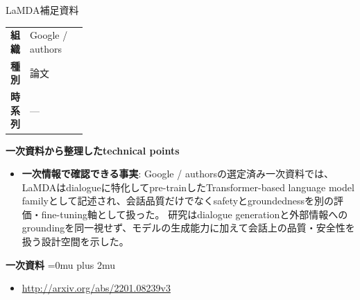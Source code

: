 \begin{technicalnote}{LaMDA}{補足資料}
\begingroup
\begin{tabularx}{\linewidth}{@{}>{\bfseries}p{0.22\linewidth}X@{}}
組織 & Google / authors \\
種別 & 論文 \\
時系列 & — \\
\end{tabularx}
\smallskip
{\bfseries 一次資料から整理したtechnical points}
\begin{itemize}[leftmargin=1.5em,itemsep=0.35em]
\item \textbf{一次情報で確認できる事実}: Google / authorsの選定済み一次資料では、LaMDAはdialogueに特化してpre-trainしたTransformer-based language model familyとして記述され、会話品質だけでなくsafetyとgroundednessを別の評価・fine-tuning軸として扱った。 研究はdialogue generationと外部情報へのgroundingを同一視せず、モデルの生成能力に加えて会話上の品質・安全性を扱う設計空間を示した。
\end{itemize}
\begin{minipage}{\linewidth}
\begin{samepage}
{\bfseries 一次資料}
\begingroup\sloppy
\Urlmuskip=0mu plus 2mu\relax
\begin{itemize}[leftmargin=1.5em,itemsep=0.25em]
\item {\scriptsize\url{http://arxiv.org/abs/2201.08239v3}}
\end{itemize}
\endgroup
\end{samepage}
\end{minipage}
\endgroup
\end{technicalnote}
\medskip

